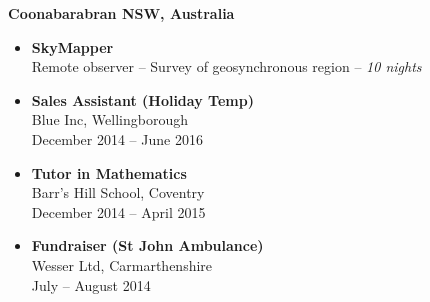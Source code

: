 \medskip

\normalsize \textbf{Coonabarabran NSW, Australia}

\medskip

\begin{itemize}
	\item \small \textbf{SkyMapper} \\
	Remote observer -- Survey of geosynchronous region -- \textit{10 nights}
\end{itemize}

\medskip


\begin{itemize}
	\item \textbf{Sales Assistant (Holiday Temp)} \\
	Blue Inc, Wellingborough \\
	December 2014 -- June 2016
	\item \textbf{Tutor in Mathematics} \\
	Barr's Hill School, Coventry \\
	December 2014 -- April 2015
	\item \textbf{Fundraiser (St John Ambulance)} \\
	Wesser Ltd, Carmarthenshire \\
	July -- August 2014
\end{itemize}
